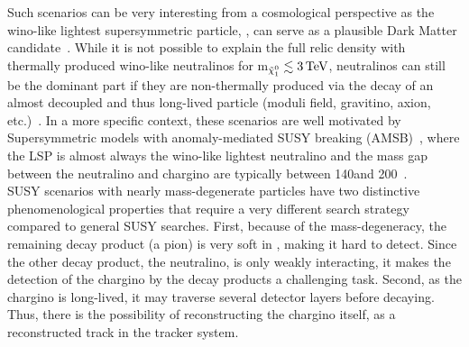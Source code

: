 Such scenarios can be very interesting from a cosmological perspective as the wino-like lightest supersymmetric particle, \chiO, can serve as a plausible Dark Matter candidate~\cite{bib:Hisano:DarkMatter_2005,bib:Ibe:DarkMatter_2015}.
While it is not possible to explain the full relic density with thermally produced wino-like neutralinos for m$_{\tilde{\chi}^{0}_{1}}\lesssim 3\,\text{Te}\kern-0.06667em\text{V}$, neutralinos can still be the dominant part if they are non-thermally produced via the decay of an almost decoupled and thus long-lived particle (moduli field, gravitino, axion, etc.)~\cite{bib:Moroi:DarkMatter_1999,bib:Moroi:DarkMatter_2013}.
In a more specific context, these scenarios are well motivated by Supersymmetric models with anomaly-mediated SUSY breaking (AMSB)~\cite{bib:Theory_AMSB_1998,bib:Theory_AMSB_1999}, where the LSP is almost always the wino-like lightest neutralino and the mass gap between the neutralino and chargino are typically between 140\mev and 200\mev~\cite{bib:Theory_MassGap_2014}. \\

SUSY scenarios with nearly mass-degenerate particles have two distinctive phenomenological properties that require a very different search strategy compared to general SUSY searches. 
First, because of the mass-degeneracy, the remaining decay product (\eg a pion) is very soft in \pt, making it hard to detect.
Since the other decay product, the neutralino, is only weakly interacting, it makes the detection of the chargino by the decay products a challenging task. 
Second, as the chargino is long-lived, it may traverse several detector layers before decaying.
Thus, there is the possibility of reconstructing the chargino itself, \eg as a reconstructed track in the tracker system.
 \\

